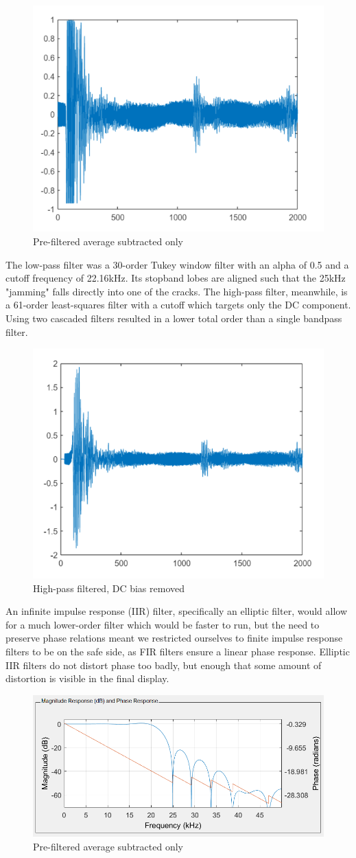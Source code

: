 \begin{figure}[H]
    \centering
    \includegraphics[width=0.5\linewidth]{figures/prefiltered.PNG}
    \caption{Pre-filtered average subtracted only}
\end{figure}
 
The low-pass filter was a 30-order Tukey window filter
with an alpha of 0.5 and a cutoff frequency of 22.16kHz. Its stopband lobes are aligned such that the 25kHz
"jamming" falls directly into one of the cracks. The high-pass filter, meanwhile, is a 61-order least-squares
 filter with a cutoff which targets only the DC component. Using two cascaded filters resulted in a lower total
 order than a single bandpass filter.

\begin{figure}[H]
    \centering
    \includegraphics[width=0.5\linewidth]{figures/debiased.PNG}
    \caption{High-pass filtered, DC bias removed}
\end{figure}

An infinite impulse response (IIR) filter, specifically an elliptic filter, would allow for a much lower-order
 filter which would be faster to run, but the need to preserve phase relations meant we restricted ourselves to
 finite impulse response filters to be on the safe side, as FIR filters ensure a linear phase response. Elliptic
 IIR filters do not distort phase too badly, but enough that some amount of distortion is visible in the final
 display.

\begin{figure}[H]
    \centering
    \includegraphics[width=0.5\linewidth]{figures/tukey.PNG}
    \caption{Pre-filtered average subtracted only}
\end{figure}

